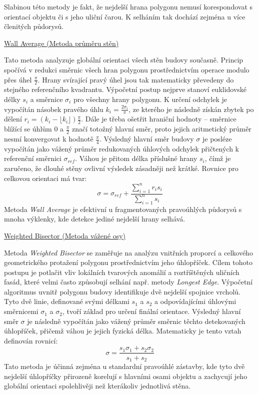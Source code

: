 \documentclass[12pt]{article}
\begin{document}
Slabinou této metody je fakt, že nejdelší hrana polygonu nemusí korespondovat s orientací objektu či s jeho uliční čarou. K selháním tak dochází zejména u více členitých půdorysů.

\underline{Wall Average (Metoda průměru stěn)}

Tato metoda analyzuje globální orientaci všech stěn budovy současně. Princip spočívá v redukci směrnic všech hran polygonu prostřednictvím operace modulo přes úhel $\frac{\pi}{2}$. Hrany svírající pravý úhel jsou tak matematicky převedeny do stejného referenčního kvadrantu. Výpočetní postup nejprve stanoví euklidovské délky $s_i$ a směrnice $\sigma_i$ pro všechny hrany polygonu. K určení odchylek je vypočítán násobek pravého úhlu $k_i = \frac{2\sigma_i}{\pi}$, ze kterého je následně získán zbytek po dělení $r_i = (k_i - \lfloor k_i \rfloor)\frac{\pi}{2}$. Dále je třeba ošetřit hraniční hodnoty – směrnice blížící se úhlům $0$ a $\frac{\pi}{2}$ značí totožný hlavní směr, proto jejich aritmetický průměr nesmí konvergovat k hodnotě $\frac{\pi}{4}$. Výsledný hlavní směr budovy $\sigma$ je posléze vypočítán jako vážený průměr redukovaných úhlových odchylek přičtených k referenční směrnici $\sigma_{ref}$. Váhou je přitom délka příslušné hrany $s_i$, čímž je zaručeno, že dlouhé stěny ovlivní výsledek zásadněji než krátké. Rovnice pro celkovou orientaci má tvar:$$\sigma = \sigma_{ref} + \frac{\sum_{i=1}^{n} r_i s_i}{\sum_{i=1}^{n} s_i}$$ Metoda \emph{Wall Average} je efektivní u fragmentovaných pravoúhlých půdorysů s mnoha výklenky, kde detekce jediné nejdelší hrany selhává.

\underline{Weighted Bisector (Metoda vážené osy)}

Metoda \emph{Weighted Bisector} se zaměřuje na analýzu vnitřních proporcí a celkového geometrického protažení polygonu prostřednictvím jeho úhlopříček. Cílem tohoto postupu je potlačit vliv lokálních tvarových anomálií a roztříštěných uličních fasád, které velmi často způsobují selhání např. metody \emph{Longest Edge}. Výpočetní algoritmus uvnitř polygonu budovy identifikuje dvě nejdelší spojnice vrcholů. Tyto dvě linie, definované svými délkami $s_1$ a $s_2$ a odpovídajícími úhlovými směrnicemi $\sigma_1$ a $\sigma_2$, tvoří základ pro určení finální orientace. Výsledný hlavní směr $\sigma$ je následně vypočítán jako vážený průměr směrnic těchto detekovaných úhlopříček, přičemž váhou je jejich fyzická délka. Matematicky je tento vztah definován rovnicí:$$\sigma = \frac{s_1\sigma_1 + s_2\sigma_2}{s_1 + s_2}$$ Tato metoda je účinná zejména u standardní pravoúhlé zástavby, kde tyto dvě nejdelší úhlopříčky přirozeně korelují s hlavními osami objektu a zachycují jeho globální orientaci spolehlivěji než kterákoliv jednotlivá stěna.
\end{document}
